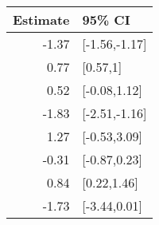 \begin{tabular}{rl}
  \hline
Estimate & 95\% CI \\ 
  \hline
-1.37 & [-1.56,-1.17] \\ 
  0.77 & [0.57,1] \\ 
  0.52 & [-0.08,1.12] \\ 
  -1.83 & [-2.51,-1.16] \\ 
  1.27 & [-0.53,3.09] \\ 
  -0.31 & [-0.87,0.23] \\ 
  0.84 & [0.22,1.46] \\ 
  -1.73 & [-3.44,0.01] \\ 
   \hline
\end{tabular}

